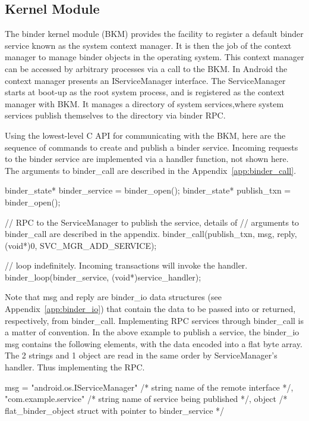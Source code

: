 \documentclass[prodmode]{acmlarge}
\begin{document}
\subsection{Kernel Module}
The binder kernel module (BKM) provides the facility to register a default binder service known as the system context manager. It is then the job of the context manager to manage binder objects in the operating system. This context manager can be accessed by arbitrary processes via a call to the BKM. In Android the context manager presents an IServiceManager interface. The ServiceManager starts at boot-up as the root system process, and is registered as the context manager with BKM. It manages a directory of system services,where system services publish themselves to the directory via binder RPC.

Using the lowest-level C API for communicating with the BKM, here are the sequence of commands to create and publish a binder service. Incoming requests to the binder service are implemented via a handler function, not shown here. The arguments to binder\_call are described in the Appendix~\ref{app:binder_call}.

\begin{snippet}[label=snip:binder_call,caption=binder\_call to publish a service with ServiceManager]
binder_state* binder_service = binder_open();
binder_state* publish_txn = binder_open();

// RPC to the ServiceManager to publish the  service, details of
// arguments to binder_call  are described in the appendix.
binder_call(publish_txn, msg, reply, (void*)0, SVC_MGR_ADD_SERVICE);

// loop indefinitely. Incoming transactions  will invoke the handler.
binder_loop(binder_service, (void*)service_handler);
\end{snippet}

Note that msg and reply are binder\_io data structures (see Appendix~\ref{app:binder_io}) that contain the data to be passed into or returned, respectively, from binder\_call. Implementing RPC services through binder\_call is a matter of convention. In the above example to publish a service, the binder\_io msg contains the following elements, with the data encoded into a flat byte array. The 2 strings and 1 object are read in the same order by ServiceManager's handler. Thus implementing the RPC.

\begin{snippet}[caption=contents of msg passed into binder\_call]
msg = {
  "android.os.IServiceManager" /* string name of the remote interface */,
  "com.example.service" /* string name of service being published */,
  object /* flat_binder_object struct with pointer to binder_service */
}
\end{snippet}
\end{document}
